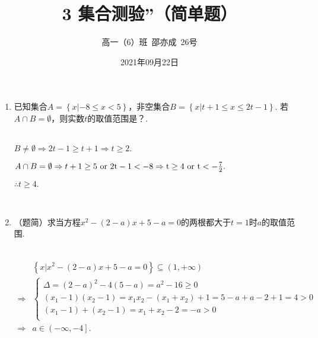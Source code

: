 \documentclass[8pt]{article}
\author{高一（6）班\ 邵亦成\ 26号}
\title{3 集合测验''（简单题）}
\date{2021年09月22日}
\begin{document}
	\maketitle

	\begin{enumerate}
		
		\item
			已知集合$A=\left\{x|-8\leq x<5\right\}$，非空集合$B=\left\{x|t+1\leq x\leq 2t-1\right\}$. 若$A\cap B=\emptyset$，则实数$t$的取值范围是？.

			~\\
			$B\neq \emptyset \Rightarrow 2t-1 \geq t+1 \Rightarrow t\geq 2.$

			$A\cap B=\emptyset \Rightarrow t+1 \geq 5 \ \rm or \  2t-1 < -8 \Rightarrow t\geq 4 \ \rm or \ t < -\frac{7}{2}.$

			$\therefore t \geq 4.$

		~\\

		\item
			（题简）求当方程$x^2-(2-a)x+5-a=0$的两根都大于$t=1$时$a$的取值范围.

			~\\
			$$
			\begin{aligned}
				&\left\{x|x^2-(2-a)x+5-a=0\right\}\subseteq(1,+\infty)\\
				\Rightarrow&\left\{
				\begin{array}{l}
					\Delta=(2-a)^2-4(5-a)=a^2-16\geq0\\
					(x_1-1)(x_2-1)=x_1x_2-(x_1+x_2)+1=5-a+a-2+1=4>0\\
					(x_1-1)+(x_2-1)=x_1+x_2-2=-a>0\\
				\end{array}
				\right.\\
				\Rightarrow&a\in\left(-\infty,-4\right].
			\end{aligned}
			$$

	\end{enumerate}
\end{document}
